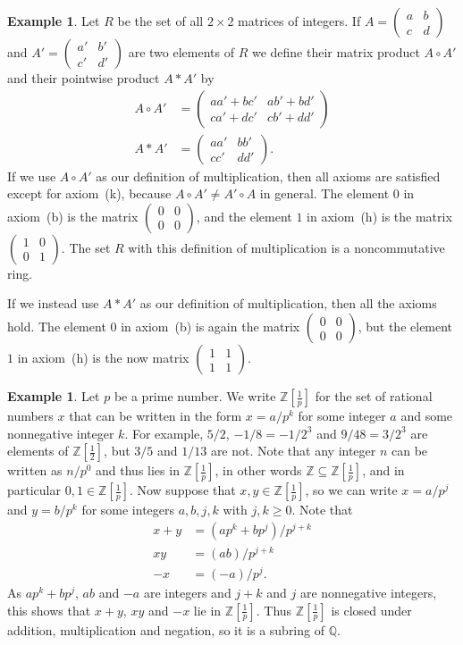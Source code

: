 \documentclass{amsart}
\newcommand{\Z}         {{\mathbb{Z}}}
\newcommand{\Q}         {{\mathbb{Q}}}
\newcommand{\tm}        {\times}
\newcommand{\bsm}       {\left(\begin{smallmatrix}}
\newcommand{\esm}       {\end{smallmatrix}\right)}
\newcommand{\pinv}      {{\textstyle\frac{1}{p}}}
\newcommand{\half}      {{\textstyle\frac{1}{2}}}
\newcommand{\sse}       {\subseteq}
\renewcommand{\:}{\colon}
\theoremstyle{definition}
\newtheorem{example}[theorem]{Example}
\begin{document}
\begin{example}\label{eg-matrix}
 Let $R$ be the set of all $2\tm 2$ matrices of integers.  If
 $A=\bsm a&b\\c&d\esm$ and $A'=\bsm a'&b'\\c'&d'\esm$ are two elements
 of $R$ we define their matrix product $A\circ A'$ and their pointwise
 product $A*A'$ by
 \begin{align*}
  A\circ A' &= \bsm aa'+bc' & ab'+bd' \\ ca'+dc' & cb'+dd' \esm \\
  A * A'    &= \bsm aa' & bb' \\ cc' & dd' \esm.
 \end{align*}
 If we use $A\circ A'$ as our definition of multiplication, then all
 axioms are satisfied except for axiom~(k), because
 $A\circ A'\neq A'\circ A$ in general.  The element $0$ in axiom~(b)
 is the matrix $\bsm 0&0\\0&0\esm$, and the element $1$ in axiom~(h)
 is the matrix $\bsm 1&0\\0&1\esm$.  The set $R$ with this definition
 of multiplication is a noncommutative ring.

 If we instead use $A*A'$ as our definition of multiplication, then
 all the axioms hold.  The element $0$ in axiom~(b) is again the
 matrix $\bsm 0&0\\0&0\esm$, but the element $1$ in axiom~(h) is the
 now matrix $\bsm 1&1\\1&1\esm$.
\end{example}
\begin{example}
 Let $p$ be a prime number.  We write $\Z[\pinv]$ for the set of
 rational numbers $x$ that can be written in the form $x=a/p^k$ for
 some integer $a$ and some nonnegative integer $k$.  For example,
 $5/2$, $-1/8=-1/2^3$ and $9/48=3/2^3$ are elements of $\Z[\half]$,
 but $3/5$ and $1/13$ are not.  Note that any integer $n$ can be
 written as $n/p^0$ and thus lies in $\Z[\pinv]$, in other words
 $\Z\sse\Z[\pinv]$, and in particular $0,1\in\Z[\pinv]$.  Now suppose
 that $x,y\in\Z[\pinv]$, so we can write $x=a/p^j$ and $y=b/p^k$ for
 some integers $a,b,j,k$ with $j,k\geq 0$.  Note that
 \begin{align*}
  x+y &= (ap^k+bp^j)/p^{j+k} \\
  xy  &= (ab)/p^{j+k} \\
  -x  &= (-a)/p^j.
 \end{align*}
 As $ap^k+bp^j$, $ab$ and $-a$ are integers and $j+k$ and $j$ are
 nonnegative integers, this shows that $x+y$, $xy$ and $-x$ lie in
 $\Z[\pinv]$.  Thus $\Z[\pinv]$ is closed under addition, multiplication
 and negation, so it is a subring of $\Q$.
\end{example}
\end{document}
